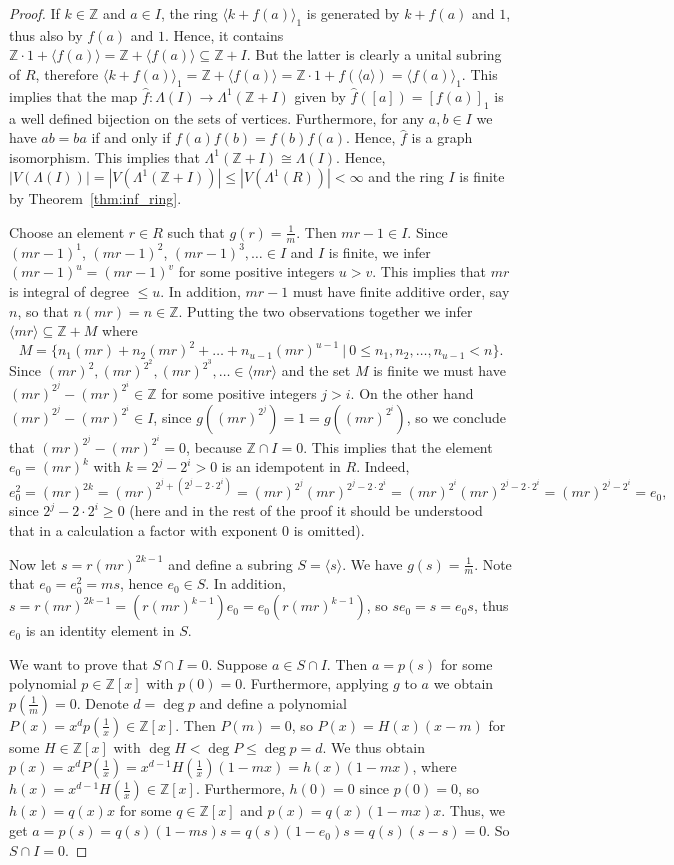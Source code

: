 \documentclass[10pt,a4paper]{amsart}
\newcommand{\Z}{\mathbb{Z}}
\newcommand{\rng}[1]{\langle #1 \rangle}
\begin{document}
\begin{proof}
If $k \in \Z$ and $a \in I$, the ring $\rng{k+f(a)}_1$ is generated by $k+f(a)$ and $1$, thus also by $f(a)$ and $1$.
Hence, it contains $\Z\cdot 1 +\rng{f(a)}=\Z + \rng{f(a)} \subseteq \Z+I$. But the latter is clearly a unital subring of $R$, therefore $\rng{k+f(a)}_1=\Z + \rng{f(a)}=\Z\cdot 1 + f(\rng{a})=\rng{f(a)}_1$.
This implies that the map $\hat{f} \colon \Lambda(I) \to \Lambda^1(\Z+I)$ given by $\hat{f}([a])=[f(a)]_1$ is a well defined bijection on the sets of vertices.
Furthermore, for any $a,b \in I$ we have $ab=ba$ if and only if $f(a)f(b)=f(b)f(a)$. Hence, $\hat{f}$ is a graph isomorphism.
This implies that $\Lambda^1(\Z+I) \cong \Lambda(I)$.
Hence, $|V(\Lambda(I))|=|V(\Lambda^1(\Z+I))| \leq |V(\Lambda^1(R))|<\infty$ and the ring $I$ is finite by Theorem~\ref{thm:inf_ring}.

Choose an element $r \in R$ such that $g(r)=\frac1m$. Then $mr-1 \in I$.
Since $(mr-1)^1$, $(mr-1)^2$, $(mr-1)^3,\ldots \in I$ and $I$ is finite, we infer $(mr-1)^u=(mr-1)^v$ for some positive integers $u>v$.
This implies that $mr$ is integral of degree $\leq u$.
In addition, $mr-1$ must have finite additive order, say $n$, so that $n(mr)=n \in \Z$.
Putting the two observations together we infer
$\rng{mr} \subseteq \Z+M$ where
$$M=\Big\{n_1(mr)+n_2(mr)^2+\ldots+n_{u-1}(mr)^{u-1} ~|~ 0 \leq n_1,n_2,\ldots,n_{u-1} <n\Big\}.$$
Since $(mr)^2,(mr)^{2^2},(mr)^{2^3},\ldots \in \rng{mr}$ and the set $M$ is finite we must have $(mr)^{2^j}-(mr)^{2^i} \in \Z$ for some positive integers $j>i$.
On the other hand $(mr)^{2^j}-(mr)^{2^i} \in I$, since $g((mr)^{2^j})=1=g((mr)^{2^i})$, so we conclude that $(mr)^{2^j}-(mr)^{2^i}=0$, because $\Z \cap I=0$.
This implies that the element $e_0=(mr)^k$ with $k=2^j-2^i>0$ is an idempotent in $R$. Indeed,
$$e_0^2=(mr)^{2k}=(mr)^{2^j+(2^j-2\cdot 2^i)}=(mr)^{2^j}(mr)^{2^j-2\cdot 2^i}=(mr)^{2^i}(mr)^{2^j-2\cdot 2^i}=(mr)^{2^j-2^i}=e_0,$$
since $2^j-2\cdot 2^i \geq 0$ (here and in the rest of the proof it should be understood that in a calculation a factor with exponent $0$ is omitted).

Now let $s=r(mr)^{2k-1}$ and define a subring $S=\rng{s}$. We have $g(s)=\frac1m$. Note that $e_0=e_0^2=ms$, hence $e_0 \in S$.
In addition, $s=r(mr)^{2k-1}=(r(mr)^{k-1})e_0=e_0(r(mr)^{k-1})$, so $se_0=s=e_0s$, thus $e_0$ is an identity element in $S$.

We want to prove that $S \cap I=0$. Suppose $a \in S \cap I$.
Then $a=p(s)$ for some polynomial $p \in \Z[x]$ with $p(0)=0$.
Furthermore, applying $g$ to $a$ we obtain $p(\frac1m)=0$.
Denote $d=\deg p$ and define a polynomial $P(x)=x^dp(\frac1x) \in \Z[x]$.
Then $P(m)=0$, so $P(x)=H(x)(x-m)$ for some $H \in \Z[x]$ with $\deg H < \deg P \leq \deg p=d$.
We thus obtain $p(x)=x^dP(\frac1x)=x^{d-1}H(\frac1x)(1-mx)=h(x)(1-mx)$, where $h(x)=x^{d-1}H(\frac1x) \in \Z[x]$.
Furthermore, $h(0)=0$ since $p(0)=0$, so $h(x)=q(x)x$ for some $q \in \Z[x]$ and $p(x)=q(x)(1-mx)x$.
Thus, we get $a=p(s)=q(s)(1-ms)s=q(s)(1-e_0)s=q(s)(s-s)=0$. So $S \cap I=0$.


\end{proof}
\end{document}
